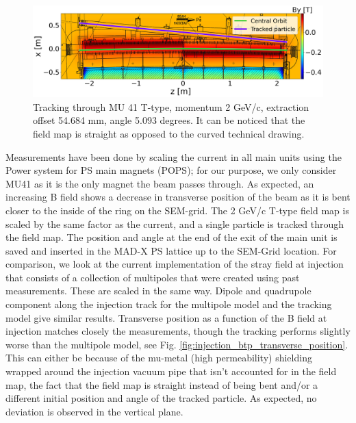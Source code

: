 \documentclass[a4paper,
               biblatex,     %
               keeplastbox,   %
               ]{jacow}
\begin{document}
\begin{figure}[!htb]
   \centering
   \includegraphics*[width=1.0\columnwidth]{injection_btp.png}
   \caption{Tracking through MU 41 T-type, momentum 2 GeV/c, extraction offset 54.684 mm, angle 5.093 degrees. It can be noticed that the field map is straight as opposed to the curved technical drawing.}
   \label{fig:injection_btp}
\end{figure}

Measurements have been done by scaling the current in all main units using the Power system for PS main magnets (POPS); for our purpose, we only consider MU41 as it is the only magnet the beam passes through. As expected, an increasing B field shows a decrease in transverse position of the beam as it is bent closer to the inside of the ring on the SEM-grid. The 2 GeV/c T-type field map is scaled by the same factor as the current, and a single particle is tracked through the field map. The position and angle at the end of the exit of the main unit is saved and inserted in the MAD-X PS lattice up to the SEM-Grid location. For comparison, we look at the current implementation of the stray field at injection that consists of a collection of multipoles that were created using past measurements. These are scaled in the same way. Dipole and quadrupole component along the injection track for the multipole model and the tracking model give similar results. Transverse position as a function of the B field at injection matches closely the measurements, though the tracking performs slightly worse than the multipole model, see Fig. \ref{fig:injection_btp_transverse_position}. This can either be because of the mu-metal (high permeability) shielding wrapped around the injection vacuum pipe that isn't accounted for in the field map, the fact that the field map is straight instead of being bent and/or a different initial position and angle of the tracked particle. As expected, no deviation is observed in the vertical plane.
\end{document}
